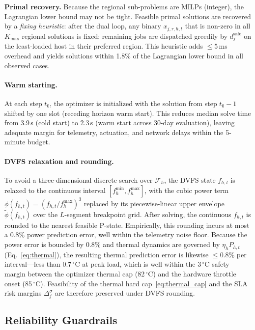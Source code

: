 \documentclass[a4paper,fleqn]{cas-dc}
\begin{document}
\textbf{Primal recovery.} Because the regional sub-problems are MILPs (integer), the Lagrangian lower bound may not be tight. Feasible primal solutions are recovered by a \emph{fixing heuristic}: after the dual loop, any binary $x_{j,r,h,t}$ that is non-zero in all $K_{\max}$ regional solutions is fixed; remaining jobs are dispatched greedily by $d^{\mathrm{safe}}_j$ on the least-loaded host in their preferred region. This heuristic adds $\leq$5\,ms overhead and yields solutions within 1.8\% of the Lagrangian lower bound in all observed cases.

\paragraph{Warm starting.}
At each step $t_0$, the optimizer is initialized with the solution from step $t_0 - 1$ shifted by one slot (receding horizon warm start). This reduces median solve time from 3.9\,s (cold start) to 2.3\,s (warm start across 30-day evaluation), leaving adequate margin for telemetry, actuation, and network delays within the 5-minute budget.

\paragraph{DVFS relaxation and rounding.}
To avoid a three-dimensional discrete search over $\mathcal{F}_h$, the DVFS state $f_{h,t}$ is relaxed to the continuous interval $[f^{\min}_h, f^{\max}_h]$, with the cubic power term $\phi(f_{h,t})=(f_{h,t}/f^{\max}_h)^3$ replaced by its piecewise-linear upper envelope $\tilde{\phi}(f_{h,t})$ over the $L$-segment breakpoint grid. After solving, the continuous $f_{h,t}$ is rounded to the nearest feasible P-state. Empirically, this rounding incurs at most a 0.8\% power prediction error, well within the telemetry noise floor. Because the power error is bounded by 0.8\% and thermal dynamics are governed by $\eta_h P_{h,t}$ (Eq.~\eqref{eq:thermal}), the resulting thermal prediction error is likewise $\leq$0.8\% per interval---less than 0.7$\,^\circ$C at peak load, which is well within the 3$\,^\circ$C safety margin between the optimizer thermal cap (82$\,^\circ$C) and the hardware throttle onset (85$\,^\circ$C). Feasibility of the thermal hard cap~\eqref{eq:thermal_cap} and the SLA risk margins $\Delta^\sigma_j$ are therefore preserved under DVFS rounding.

\subsection{Reliability Guardrails}
\label{sec:guardrails}
\end{document}
